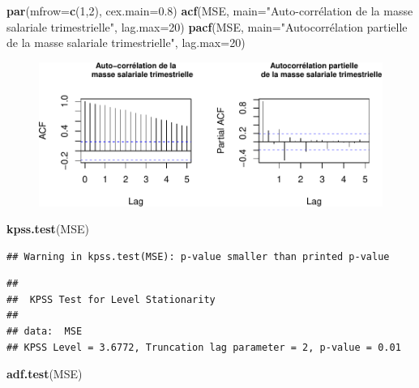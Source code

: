 \documentclass[11pt,]{article}
\newenvironment{Shaded}{\begin{snugshade}}{\end{snugshade}}
\newcommand{\KeywordTok}[1]{\textcolor[rgb]{0.13,0.29,0.53}{\textbf{#1}}}
\newcommand{\DataTypeTok}[1]{\textcolor[rgb]{0.13,0.29,0.53}{#1}}
\newcommand{\DecValTok}[1]{\textcolor[rgb]{0.00,0.00,0.81}{#1}}
\newcommand{\FloatTok}[1]{\textcolor[rgb]{0.00,0.00,0.81}{#1}}
\newcommand{\StringTok}[1]{\textcolor[rgb]{0.31,0.60,0.02}{#1}}
\newcommand{\NormalTok}[1]{#1}
\begin{document}
\begin{Shaded}
\begin{Highlighting}[]
  \KeywordTok{par}\NormalTok{(}\DataTypeTok{mfrow=}\KeywordTok{c}\NormalTok{(}\DecValTok{1}\NormalTok{,}\DecValTok{2}\NormalTok{), }\DataTypeTok{cex.main=}\FloatTok{0.8}\NormalTok{)}
  \KeywordTok{acf}\NormalTok{(MSE, }\DataTypeTok{main=}\StringTok{"Auto-corrélation de la}
\StringTok{      masse salariale trimestrielle"}\NormalTok{, }\DataTypeTok{lag.max=}\DecValTok{20}\NormalTok{)}
  \KeywordTok{pacf}\NormalTok{(MSE, }\DataTypeTok{main=}\StringTok{"Autocorrélation partielle}
\StringTok{       de la masse salariale trimestrielle"}\NormalTok{, }\DataTypeTok{lag.max=}\DecValTok{20}\NormalTok{)}
\end{Highlighting}
\end{Shaded}

\begin{figure}
\centering
\includegraphics{doc_files/figure-latex/unnamed-chunk-2-1.pdf}
\caption{\label{fig2}}
\end{figure}

\begin{Shaded}
\begin{Highlighting}[]
  \KeywordTok{kpss.test}\NormalTok{(MSE)}
\end{Highlighting}
\end{Shaded}

\begin{verbatim}
## Warning in kpss.test(MSE): p-value smaller than printed p-value
\end{verbatim}

\begin{verbatim}
## 
##  KPSS Test for Level Stationarity
## 
## data:  MSE
## KPSS Level = 3.6772, Truncation lag parameter = 2, p-value = 0.01
\end{verbatim}

\begin{Shaded}
\begin{Highlighting}[]
  \KeywordTok{adf.test}\NormalTok{(MSE)}
\end{Highlighting}
\end{Shaded}
\end{document}
